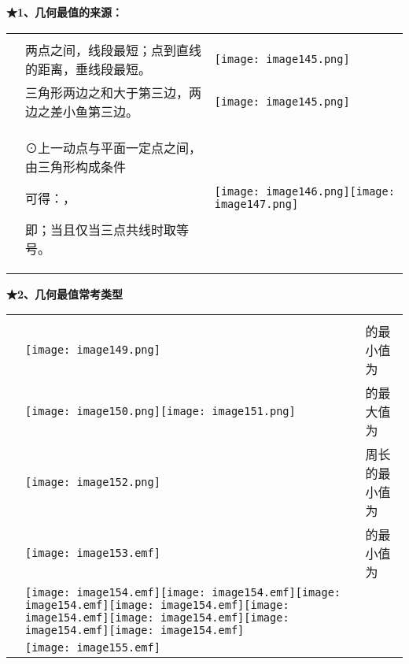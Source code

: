 \textbf{★1、几何最值的来源：}

\begin{longtable}[]{@{}lll@{}}
\toprule
\endhead
& &\tabularnewline
& 两点之间，线段最短；点到直线的距离，垂线段最短。 &
\texttt{[image: image145.png]}\tabularnewline
& 三角形两边之和大于第三边，两边之差小鱼第三边。 &
\texttt{[image: image145.png]}\tabularnewline
\begin{minipage}[t]{0.30\columnwidth}\raggedright
\strut
\end{minipage} & \begin{minipage}[t]{0.30\columnwidth}\raggedright
⊙上一动点与平面一定点之间，由三角形构成条件

可得：，

即；当且仅当三点共线时取等号。\strut
\end{minipage} & \begin{minipage}[t]{0.30\columnwidth}\raggedright
\texttt{[image: image146.png]}\texttt{[image: image147.png]}\strut
\end{minipage}\tabularnewline
\bottomrule
\end{longtable}

\textbf{★2、几何最值常考类型}

\begin{longtable}[]{@{}lll@{}}
\toprule
\endhead
& &\tabularnewline
&
\texttt{[image: image149.png]}
& 的最小值为\tabularnewline
&
\texttt{[image: image150.png]}\texttt{[image: image151.png]}
& 的最大值为\tabularnewline
&
\texttt{[image: image152.png]}
& 周长的最小值为\tabularnewline
&
\texttt{[image: image153.emf]}
& 的最小值为\tabularnewline
&
\texttt{[image: image154.emf]}\texttt{[image: image154.emf]}\texttt{[image: image154.emf]}\texttt{[image: image154.emf]}\texttt{[image: image154.emf]}\texttt{[image: image154.emf]}\texttt{[image: image154.emf]}\texttt{[image: image154.emf]}
&\tabularnewline
&
\texttt{[image: image155.emf]}
&\tabularnewline
\bottomrule
\end{longtable}

